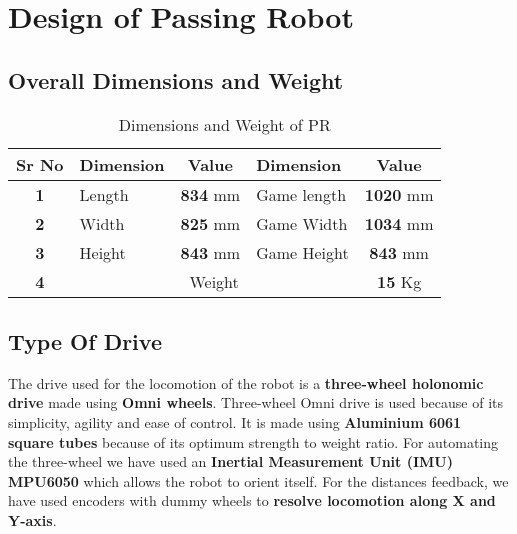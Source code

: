 \section{Design of Passing Robot}
    \subsection{Overall Dimensions and Weight}
        \begin{table}[h]
            \caption{Dimensions and Weight of PR} \label{Dimensions_PR} \small
            \begin{tabular}{|c|l|c|l|c|}
                \hline
                \textbf{Sr No}  & \textbf{Dimension} & \textbf{Value}  & \textbf{Dimension}      & \textbf{Value}   \\ \hline
                \textbf{1}      & Length             & \textbf{834} mm & Game length             & \textbf{1020} mm \\ \hline
                \textbf{2}      & Width              & \textbf{825} mm & Game Width              & \textbf{1034} mm \\ \hline
                \textbf{3}      & Height             & \textbf{843} mm & Game Height             & \textbf{843} mm  \\ \hline
                \textbf{4}      & \multicolumn{3}{c|}{Weight}                                    & \textbf{15} Kg      \\ \hline
            \end{tabular}
        \end{table}
        
    \subsection{Type Of Drive}
        The drive used for the locomotion of the robot is a \textbf{three-wheel holonomic drive} made using \textbf{Omni wheels}. Three-wheel Omni drive is 
        used because of its simplicity, agility and ease of control. It is made using \textbf{Aluminium 6061 square tubes} because of its optimum 
        strength to weight ratio. For automating the three-wheel we have used an \textbf{Inertial Measurement Unit (IMU) MPU6050} which allows 
        the robot to orient itself. For the distances feedback, we have used encoders with dummy wheels to \textbf{resolve locomotion along X and 
        Y-axis}.

